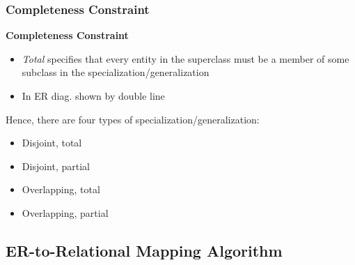 \subsubsection{Completeness Constraint}
\textbf{Completeness Constraint}
\begin{itemize}[label=\(\rhd\)]
    \item \textit{Total} specifies that every entity in the superclass must be a member of some subclass in the specialization/generalization 
    \item In ER diag. shown by double line
\end{itemize}

Hence, there are four types of specialization/generalization:
\begin{itemize}[label=\(\rhd\)]
    \item Disjoint, total
    \item Disjoint, partial
    \item Overlapping, total
    \item Overlapping, partial
\end{itemize}


\subsection{ER-to-Relational Mapping Algorithm}



